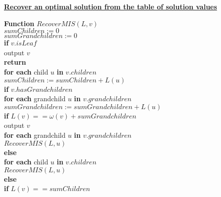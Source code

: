\documentclass[11pt]{article}
\begin{document}
\begin{enumerate}
  \underline{\textbf{Recover an optimal solution from the table of
      solution values}}

  \textbf{Function} $RecoverMIS(L, v)$ \\
  \-\hspace{2em} $sumChildren := 0$ \\
  \-\hspace{2em} $sumGrandchildren := 0$ \\
  \-\hspace{2em} \textbf{if} $v.isLeaf$ \\
  \-\hspace{4em} output $v$ \\
  \-\hspace{4em} \textbf{return} \\
  \-\hspace{2em} \textbf{for each} child $u$ \textbf{in} $v.children$ \\ 
  \-\hspace{4em} $sumChildren := sumChildren + L(u)$ \\ 
  \-\hspace{2em} \textbf{if} $v.hasGrandchildren$ \\
  \-\hspace{4em} \textbf{for each} grandchild $u$ \textbf{in}
  $v.grandchildren$ \\
  \-\hspace{6em} $sumGrandchildren := sumGrandchildren + L(u)$ \\
  \-\hspace{4em} \textbf{if} $L(v) == \omega(v) + sumGrandchildren$ \\
  \-\hspace{6em} output $v$ \\
  \-\hspace{6em} \textbf{for each} grandchild $u$ \textbf{in} $v.grandchildren$\\
  \-\hspace{8em} $RecoverMIS(L, u)$ \\
  \-\hspace{4em} \textbf{else} \\
  \-\hspace{6em} \textbf{for each} child $u$ \textbf{in} $v.children$ \\ 
  \-\hspace{8em} $RecoverMIS(L, u)$\\
  \-\hspace{2em} \textbf{else} \\
  \-\hspace{4em} \textbf{if} $L(v) == sumChildren$ \\

\end{enumerate}
\end{document}
